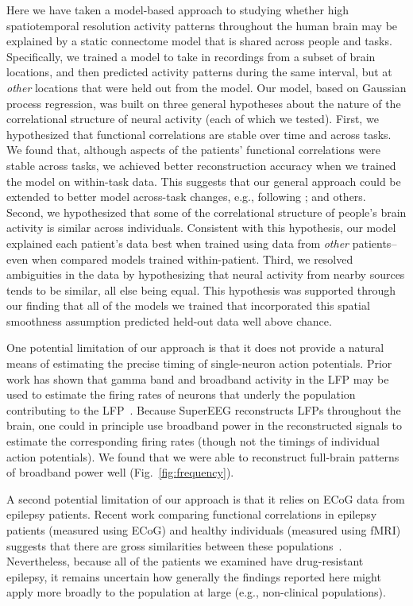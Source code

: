 \documentclass[11pt]{article}
\begin{document}
Here we have taken a model-based approach to studying whether high
spatiotemporal resolution activity patterns throughout the human brain may be
explained by a static connectome model that is shared across people and tasks.
Specifically, we trained a model to take in recordings from a subset of brain
locations, and then predicted activity patterns during the same interval, but at
\textit{other} locations that were held out from the model.  Our model, based on
Gaussian process regression, was built on three general hypotheses about the
nature of the correlational structure of neural activity (each of which we
tested).  First, we hypothesized that functional correlations are stable over
time and across tasks.  We found that, although aspects of the patients'
functional correlations were stable across tasks, we achieved better
reconstruction accuracy when we trained the model on within-task data. This
suggests that our general approach could be extended to better model across-task
changes, e.g., following \cite{ColeEtal16, TavoEtal16}; and others. Second, we
hypothesized that some of the correlational structure of people's brain activity
is similar across individuals.  Consistent with this hypothesis, our model
explained each patient's data best when trained using data from \textit{other}
patients-- even when compared models trained within-patient. Third, we
resolved ambiguities in the data by hypothesizing that neural activity from
nearby sources tends to be similar, all else being equal.  This hypothesis
was supported through our finding that all of the models we trained that
incorporated this spatial smoothness assumption predicted held-out data well
above chance.

One potential limitation of our approach is that it does not provide a natural
means of estimating the precise timing of single-neuron action potentials. Prior
work has shown that gamma band and broadband activity in the LFP may be used to
estimate the firing rates of neurons that underly the population contributing to
the LFP~\citep{MillEtal08, MannEtal09, JacoEtal10b, CronEtal11}. Because
SuperEEG reconstructs LFPs throughout the brain, one could in principle use
broadband power in the reconstructed signals to estimate the corresponding
firing rates (though not the timings of individual action potentials).  We found
that we were able to reconstruct full-brain patterns of broadband power well
(Fig.~\ref{fig:frequency}).

A second potential limitation of our approach is that it relies on
ECoG data from epilepsy patients.  Recent work comparing functional
correlations in epilepsy patients (measured using ECoG) and healthy
individuals (measured using fMRI) suggests that there are gross
similarities between these populations~\citep[e.g.,][]{ReddEtal18,
  KucyEtal18}.  Nevertheless, because all of the patients we examined
have drug-resistant epilepsy, it remains uncertain how generally the
findings reported here might apply more broadly to the population at
large (e.g., non-clinical populations).
\end{document}
